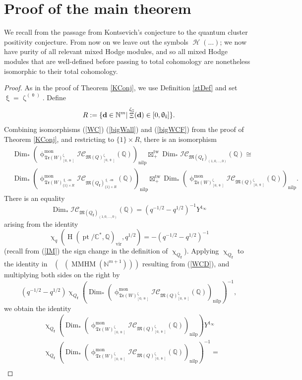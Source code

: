 \documentclass[a4paper,10pt]{amsart}
\newcommand{\BC}{\pt/\mathbb{C}^*}
\newcommand{\dd}{\mathbf{d}}
\newcommand{\ff}{\mathbf{f}}
\newcommand{\WWW}{\mathfrak{Tr}(W)}
\newcommand{\Mst}{\mathfrak{M}}
\newcommand{\ICS}{\mathcal{IC}}
\newcommand{\phim}[1]{\phi^{\mon}_{#1}}
\renewcommand{\theta}{\uptheta}
\renewcommand{\zeta}{\upzeta}
\renewcommand{\xi}{\upxi}
\renewcommand{\chi}{\upchi}
\renewcommand{\phi}{\upphi}
\DeclareMathOperator{\sst}{-ss}
\DeclareMathOperator{\nilp}{nilp}
\DeclareMathOperator{\KK}{K_0}
\DeclareMathOperator{\Dim}{Dim}
\DeclareMathOperator{\tw}{tw}
\DeclareMathOperator{\mon}{mon}
\DeclareMathOperator{\Mu}{\Upxi}
\DeclareMathOperator{\MMHM}{MMHM}
\DeclareMathOperator{\pt}{pt}
\DeclareMathOperator{\Ss}{\overline{s}}
\DeclareMathOperator{\vir}{vir}
\DeclareMathOperator{\Ho}{\mathcal{H}}
\DeclareMathOperator{\HO}{H}
\DeclareMathOperator{\Dulf}{\mathcal{D}^{\geq, lf}}
\begin{document}
\section{Proof of the main theorem}
\label{mainProof}

\label{cluVia}
We recall from \cite{Efi11} the passage from Kontsevich's conjecture to the quantum cluster positivity conjecture.  From now on we leave out the symbols $\Ho(\ldots)$; we now have purity of all relevant mixed Hodge modules, and so all mixed Hodge modules that are well-defined before passing to total cohomology are nonetheless isomorphic to their total cohomology.  
\renewcommand*{\proofname}{Proof of Theorem \ref{mainThm}}
\begin{proof}
As in the proof of Theorem \ref{KConj}, we use Definition \ref{ztDef} and set $\xi=\zeta_{\Ss}^{(\theta_{\Ss})}$.  Define
\[
R:=\{\dd\in\mathbb{N}^m|\Mu^{\zeta_{\Ss}}(\dd)\in[0,\theta_{\Ss}]\}.  
\]
Combining isomorphisms (\ref{WC}) (\ref{bigWall}) and (\ref{bigWCF}) from the proof of Theorem \ref{KConj}, and restricting to $\{1\}\times R$, there is an isomorphism
\begin{align}\label{WCD}
&\Dim_*\left(\phim{\WWW^{\zeta_{\Ss}}_{[0,\theta_{\Ss}]}}\ICS_{\Mst(Q)_{[0, \theta_{\Ss}]}^{\zeta_{\Ss}}}(\mathbb{Q})\right)_{\nilp}\boxtimes_{+}^{\tw}\Dim_*\ICS_{\Mst(Q_{\ff})_{(1,0,\ldots,0)}}(\mathbb{Q})\cong\\
&\Dim_*\left(\phim{\WWW^{\xi\sst}_{\{1\}\times R}}\ICS_{\Mst(Q_{\ff})_{\{1\}\times R}^{\xi\sst}}(\mathbb{Q})\right)_{\nilp}\boxtimes^{\tw}_{+} \Dim_*\left(\phim{\WWW^{\zeta_{\Ss}}_{[0, \theta_{\Ss}]}}\ICS_{\Mst(Q)_{[0, \theta_{\Ss}]}^{\zeta_{\Ss}}}(\mathbb{Q})\right)_{\nilp}.\nonumber
\end{align}
There is an equality
\[
\Dim_*\ICS_{\Mst(Q_{\ff})_{(1,0,\ldots,0)}}(\mathbb{Q})=(q^{-1/2}-q^{1/2})^{-1}Y^{1_{\infty}}
\]
arising from the identity 
\[
\chi_q\left(\HO(\BC,\mathbb{Q})_{\vir},q^{1/2}\right)=-(q^{-1/2}-q^{1/2})^{-1}
\]
(recall from (\ref{IM}) the sign change in the definition of $\chi_{Q_{\ff}}$).
Applying $\chi_{Q_{\ff}}$ to the identity in $\KK(\Dulf(\MMHM(\mathbb{N}^{m+1})))$ resulting from (\ref{WCD}), and multiplying both sides on the right by 
\[
\left(q^{-1/2}-q^{1/2}\right)\chi_{Q_\ff}\left(  \Dim_*\left(\phim{\WWW^{\zeta_{\Ss}}_{[0, \theta_{\Ss}]}}\ICS_{\Mst(Q)_{[0, \theta_{\Ss}]}^{\zeta_{\Ss}}}(\mathbb{Q})\right)_{\nilp} \right)^{-1}, 
\]
we obtain the identity 
\begin{align}\label{finalId}
&\chi_{Q_{\ff}}\left(  \Dim_*\left(\phim{\WWW^{\zeta_{\Ss}}_{[0,\theta_{\Ss}]}}\ICS_{\Mst(Q)_{[0,\theta_{\Ss}]}^{\zeta_{\Ss}}}(\mathbb{Q})\right)_{\nilp} \right)Y^{1_\infty}\\ \nonumber&\chi_{Q_{\ff}}\left(  \Dim_*\left(\phim{\WWW^{\zeta_{\Ss}}_{[0,\theta_{\Ss}]}}\ICS_{\Mst(Q)_{[0,\theta_{\Ss}]}^{\zeta_{\Ss}}}(\mathbb{Q})\right)_{\nilp} \right)^{-1}=\\

\end{align}
\end{proof}
\end{document}
